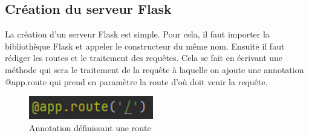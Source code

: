 \documentclass{article}
\begin{document}
\subsection{Création du serveur Flask}
La création d’un serveur Flask est simple. Pour cela, il faut importer la bibliothèque Flask et appeler le constructeur du même nom. Ensuite il faut rédiger les routes et le traitement des requêtes. Cela se fait en écrivant une méthode qui sera le traitement de la requête à laquelle on ajoute une annotation @app.route qui prend en paramètre la route d’où doit venir la requête.
\begin{figure}[H]
\center
\includegraphics[scale = 0.7]{images/flask.png}
\caption{Annotation définissant une route}
\end{figure}
\end{document}
